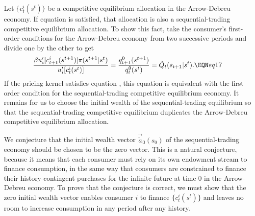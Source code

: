 Let
$\{c_t^i(s^t)\}$ be a competitive equilibrium allocation
in the Arrow-Debreu economy.
If equation  is satisfied, that allocation is also a
sequential-trading competitive equilibrium allocation.  To show this fact,
take the consumer's first-order conditions  for the Arrow-Debreu
economy from two successive periods and divide one by
the other to get
$$ {\beta u'_i[c_{t+1}^i(s^{t+1})] \pi(s^{t+1} | s^t) \over
       u'_i[c_t^i(s^t)]} = {q^0_{t+1}(s^{t+1}) \over q_t^0(s^t) }
   = \tilde Q_t(s_{t+1}\vert s^t).  \EQN eq17 $$
If the pricing kernel satisfies equation , this equation
is equivalent with the first-order condition  for the sequential-trading
competitive equilibrium economy. It remains for us
to choose the initial wealth of the sequential-trading equilibrium so
that the sequential-trading competitive equilibrium duplicates the
Arrow-Debreu competitive equilibrium allocation.


We conjecture that the initial wealth vector
$\vec {\tilde a}_0(s_0)$ of the sequential-trading economy should be chosen
to be the zero vector. This is a natural conjecture, because
it means that each consumer must rely on its own
endowment stream to finance consumption, in the same way that consumers are
constrained to finance their history-contingent purchases
for the infinite future at time $0$ in the Arrow-Debreu economy.
To prove that the conjecture is correct, we must show that the zero
initial wealth vector enables consumer $i$ to finance $\{c^i_t(s^t)\}$
and leaves no room to increase consumption in any period
 after any history.


